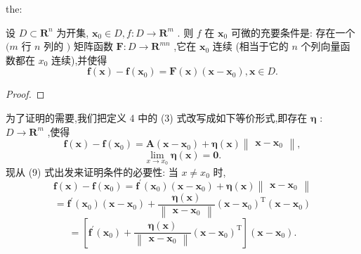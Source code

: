 \begin{theorem}{}{the:}

\end{theorem}
 设 \(D \subset  {\mathbf{R}}^{n}\) 为开集, \({\mathbf{x}}_{0} \in  D,f : D \rightarrow  {\mathbf{R}}^{m}\) . 则 \(f\) 在 \({\mathbf{x}}_{0}\) 可微的充要条件是: 存在一个 \((m\) 行 \(n\) 列的 \()\) 矩阵函数 \(\mathbf{F} : D \rightarrow  {\mathbf{R}}^{mn}\) ,它在 \({\mathbf{x}}_{0}\) 连续 (相当于它的 \(n\) 个列向量函数都在 \({x}_{0}\) 连续),并使得
\[
\mathbf{f}\left( \mathbf{x}\right)  - \mathbf{f}\left( {\mathbf{x}}_{0}\right)  = \mathbf{F}\left( \mathbf{x}\right) \left( {\mathbf{x} - {\mathbf{x}}_{0}}\right) ,\mathbf{x} \in  D. \tag{8}
\]
\begin{proof}

\end{proof}
为了证明的需要,我们把定义 4 中的 (3) 式改写成如下等价形式,即存在 \(\mathbf{\eta }\) : \(D \rightarrow  {\mathbf{R}}^{m}\) ,使得
\[
\mathbf{f}\left( \mathbf{x}\right)  - \mathbf{f}\left( {\mathbf{x}}_{0}\right)  = \mathbf{A}\left( {\mathbf{x} - {\mathbf{x}}_{0}}\right)  + \mathbf{\eta }\left( \mathbf{x}\right) \begin{Vmatrix}{\mathbf{x} - {\mathbf{x}}_{0}}\end{Vmatrix}, \tag{9}
\]
\[
\mathop{\lim }\limits_{{x \rightarrow  {x}_{0}}}\mathbf{\eta }\left( \mathbf{x}\right)  = \mathbf{0}.
\]
现从 (9) 式出发来证明条件的必要性: 当 \(x \neq  {x}_{0}\) 时,
\[
\mathbf{f}\left( \mathbf{x}\right)  - \mathbf{f}\left( {\mathbf{x}}_{0}\right)  = {\mathbf{f}}^{\prime }\left( {\mathbf{x}}_{0}\right) \left( {\mathbf{x} - {\mathbf{x}}_{0}}\right)  + \mathbf{\eta }\left( \mathbf{x}\right) \begin{Vmatrix}{\mathbf{x} - {\mathbf{x}}_{0}}\end{Vmatrix}
\]
\[
= {\mathbf{f}}^{\prime }\left( {\mathbf{x}}_{0}\right) \left( {\mathbf{x} - {\mathbf{x}}_{0}}\right)  + \frac{\mathbf{\eta }\left( \mathbf{x}\right) }{\begin{Vmatrix}\mathbf{x} - {\mathbf{x}}_{0}\end{Vmatrix}}{\left( \mathbf{x} - {\mathbf{x}}_{0}\right) }^{\mathrm{T}}\left( {\mathbf{x} - {\mathbf{x}}_{0}}\right)
\]
\[
= \left\lbrack  {{\mathbf{f}}^{\prime }\left( {\mathbf{x}}_{0}\right)  + \frac{\mathbf{\eta }\left( \mathbf{x}\right) }{\begin{Vmatrix}\mathbf{x} - {\mathbf{x}}_{0}\end{Vmatrix}}{\left( \mathbf{x} - {\mathbf{x}}_{0}\right) }^{\mathrm{T}}}\right\rbrack  \left( {\mathbf{x} - {\mathbf{x}}_{0}}\right) . \tag{10}
\]
